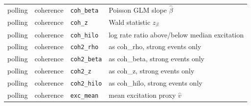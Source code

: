 \documentclass[10pt]{article}
\begin{document}
\begin{table}[!htbp]
{\begin{tabular}{@{}lllp{9cm}@{}}
polling & coherence & \texttt{coh\_beta} & Poisson GLM slope $\hat\beta$ \\
polling & coherence & \texttt{coh\_z} & Wald statistic $z_\beta$ \\
polling & coherence & \texttt{coh\_hilo} & log rate ratio above/below median excitation \\
polling & coherence & \texttt{coh2\_rho} & as coh\_rho, strong events only \\
polling & coherence & \texttt{coh2\_beta} & as coh\_beta, strong events only \\
polling & coherence & \texttt{coh2\_z} & as coh\_z, strong events only \\
polling & coherence & \texttt{coh2\_hilo} & as coh\_hilo, strong events only \\
polling & coherence & \texttt{exc\_mean} & mean excitation proxy $\hat v$ \\
\bottomrule
\end{tabular}}
\end{table}
\end{document}
